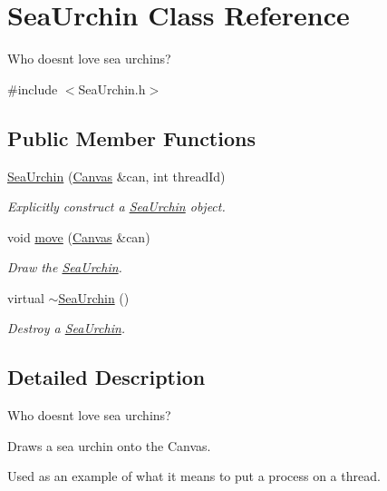 \hypertarget{class_sea_urchin}{}\section{Sea\+Urchin Class Reference}
\label{class_sea_urchin}


Who doesn\textquotesingle{}t love sea urchins?  




{\ttfamily \#include $<$Sea\+Urchin.\+h$>$}

\subsection*{Public Member Functions}
\begin{DoxyCompactItemize}
\item 
\hyperlink{class_sea_urchin_a29fac511aa0967424cbfb0729ce06f2c}{Sea\+Urchin} (\hyperlink{classtsgl_1_1_canvas}{Canvas} \&can, int thread\+Id)
\begin{DoxyCompactList}\small\item\em Explicitly construct a \hyperlink{class_sea_urchin}{Sea\+Urchin} object. \end{DoxyCompactList}\item 
void \hyperlink{class_sea_urchin_aa0e038a0faecaead5928edc082dbc685}{move} (\hyperlink{classtsgl_1_1_canvas}{Canvas} \&can)
\begin{DoxyCompactList}\small\item\em Draw the \hyperlink{class_sea_urchin}{Sea\+Urchin}. \end{DoxyCompactList}\item 
virtual \hyperlink{class_sea_urchin_a30d580184797c2cf2b6f6eac21bc3b07}{$\sim$\+Sea\+Urchin} ()
\begin{DoxyCompactList}\small\item\em Destroy a \hyperlink{class_sea_urchin}{Sea\+Urchin}. \end{DoxyCompactList}\end{DoxyCompactItemize}


\subsection{Detailed Description}
Who doesn\textquotesingle{}t love sea urchins? 

Draws a sea urchin onto the Canvas.

Used as an example of what it means to put a process on a thread.

